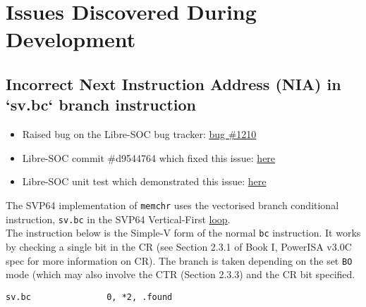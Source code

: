 %

\chapter{Issues Discovered During Development}

\section{Incorrect Next Instruction Address (NIA) in `sv.bc` branch instruction}

\begin{itemize}
  \item Raised bug on the Libre-SOC bug tracker:
  \href{https://bugs.libre-soc.org/show_bug.cgi?id=1210}{bug \#1210}
  \item Libre-SOC commit \#d9544764 which fixed this issue:
  \href{https://git.libre-soc.org/?p=openpower-isa.git;a=commitdiff;h=d9544764b1710f3807a9c0685d150a665f70b9a2}{here}
  \item Libre-SOC unit test which demonstrated this issue:
  \href{https://git.libre-soc.org/?p=openpower-isa.git;a=blob;f=src/openpower/decoder/isa/test_caller_svp64_bc.py;h=93689ded619f8fa67b455f18b122fa60220ddea1;hb=089e6d352ec57be4ab645d18ad9e95df3af0d365#l310}{here}
\end{itemize}

The \acrshort{SVP64} implementation of \texttt{memchr} uses the vectorised branch
conditional instruction, \texttt{sv.bc} in the \acrshort{SVP64} Vertical-First
\href{https://git.vantosh.com/ngisearch/glibc-svp64/src/commit/1afb94889b8ea2f85844e410f87e5a9b8e2e959f/svp64-port/svp64/memchr_svp64.s#L67}{loop}.\\

The instruction below is the Simple-V form of the normal \texttt{bc} instruction.
It works by checking a single bit in the \acrfull{CR}
(see Section 2.3.1 of Book I, PowerISA v3.0C spec for more information
on \acrshort{CR}).
The branch is taken depending on the set \texttt{BO} mode (which may also
involve the \acrfull{CTR} (Section 2.3.3) and the CR bit specified.

\begin{verbatim}
sv.bc               0, *2, .found
\end{verbatim}

